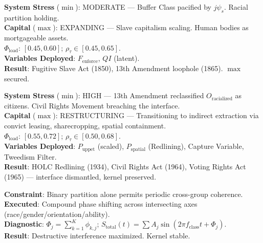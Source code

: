 \begin{tcolorbox}[colback=black!5, colframe=black!70, fonttitle=\bfseries\ttfamily, title=4. RUNTIME LOG: 1704--1865 (AMERICAN SOUTH) \normalfont\small--- Chapter \ref{ch:enforcement}]
\ttfamily\small
\textbf{System Stress} ($\min$): MODERATE --- Buffer Class pacified by $j\psi_s$. Racial partition holding.\\
\textbf{Capital} ($\max$): EXPANDING --- Slave capitalism scaling. Human bodies as mortgageable assets.\\
\textbf{$\Phi_{\text{load}}$}: $[0.45, 0.60]$; $\rho_{\tau} \in [0.45, 0.65]$.\\
\textbf{Variables Deployed}: $F_{\text{enforce}}$, $QI$ (latent).\\
\textbf{Result}: Fugitive Slave Act (1850), 13th Amendment loophole (1865). $\max$ secured.
\end{tcolorbox}

\begin{tcolorbox}[colback=black!5, colframe=black!70, fonttitle=\bfseries\ttfamily, title=5. RUNTIME LOG: 1870s--1960s (RECONSTRUCTION $\rightarrow$ CIVIL RIGHTS) \normalfont\small--- Chapter \ref{ch:containment}]
\ttfamily\small
\textbf{System Stress} ($\min$): HIGH --- 13th Amendment reclassified $O_{\text{racialized}}$ as citizens. Civil Rights Movement breaching the interface.\\
\textbf{Capital} ($\max$): RESTRUCTURING --- Transitioning to indirect extraction via convict leasing, sharecropping, spatial containment.\\
\textbf{$\Phi_{\text{load}}$}: $[0.55, 0.72]$; $\rho_{\tau} \in [0.50, 0.68]$.\\
\textbf{Variables Deployed}: $P_{\text{uppet}}$ (scaled), $P_{\text{spatial}}$ (Redlining), Capture Variable, Tweedism Filter.\\
\textbf{Result}: HOLC Redlining (1934), Civil Rights Act (1964), Voting Rights Act (1965) --- interface dismantled, kernel preserved.
\end{tcolorbox}

\begin{tcolorbox}[colback=black!5, colframe=black!70, fonttitle=\bfseries\ttfamily, title=6. RUNTIME LOG: v5.0 (FRACTAL INTERFERENCE ENGINE) \normalfont\small--- Chapter \ref{ch:tweedism}]
\ttfamily\small
\textbf{Constraint}: Binary partition alone permits periodic cross-group coherence.\\
\textbf{Executed}: Compound phase shifting across intersecting axes (race/gender/orientation/ability).\\
\textbf{Diagnostic}: $\Phi_j = \sum_{k=1}^{K}\phi_{k,j}$; $S_{\text{total}}(t) = \sum A_j\sin(2\pi f_{\text{class}}t + \Phi_j)$.\\
\textbf{Result}: Destructive interference maximized. Kernel stable.
\end{tcolorbox}


